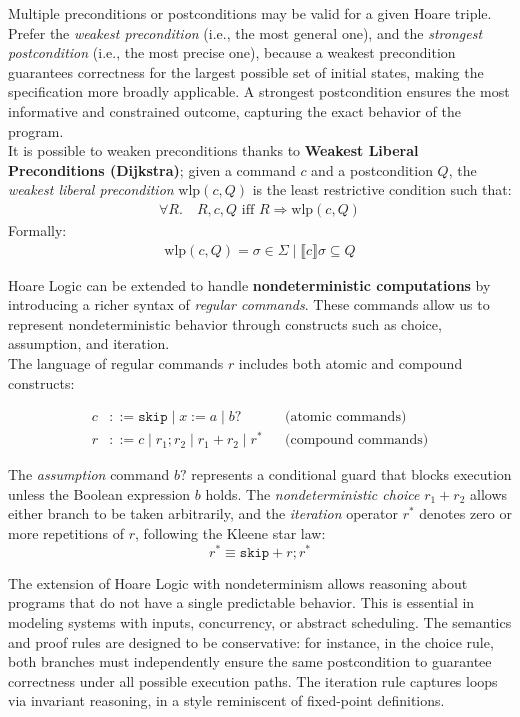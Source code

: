 \documentclass[parskip=half]{scrartcl}
\begin{document}
Multiple preconditions or postconditions may be valid for a given Hoare triple. Prefer the \emph{weakest precondition} (i.e., the most general one), and the \emph{strongest postcondition} (i.e., the most precise one), because a weakest precondition guarantees correctness for the largest possible set of initial states, making the specification more broadly applicable. A strongest postcondition ensures the most informative and constrained outcome, capturing the exact behavior of the program.
\\It is possible to weaken preconditions thanks to \textbf{Weakest Liberal Preconditions (Dijkstra)}; given a command $c$ and a postcondition $Q$, the \emph{weakest liberal precondition} $\text{wlp}(c, Q)$ is the least restrictive condition such that:
\begin{align*}
\forall R. \quad {R}, c, {Q} \text{ iff } R \Rightarrow \text{wlp}(c, Q)
\end{align*}
Formally:
\begin{align*}
\text{wlp}(c, Q) = {\sigma \in \Sigma \mid \llbracket c \rrbracket {\sigma} \subseteq Q}
\end{align*}

Hoare Logic can be extended to handle \textbf{nondeterministic computations} by introducing a richer syntax of \emph{regular commands}. These commands allow us to represent nondeterministic behavior through constructs such as choice, assumption, and iteration.
\\ The language of regular commands $r$ includes both atomic and compound constructs:

\begin{align*}
  c &::= \texttt{skip} \mid x := a \mid b? && \text{(atomic commands)} \\
  r &::= c \mid r_1 ; r_2 \mid r_1 + r_2 \mid r^* && \text{(compound commands)}
\end{align*}

\noindent
The \emph{assumption} command $b?$ represents a conditional guard that blocks execution unless the Boolean expression $b$ holds. The \emph{nondeterministic choice} $r_1 + r_2$ allows either branch to be taken arbitrarily, and the \emph{iteration} operator $r^*$ denotes zero or more repetitions of $r$, following the Kleene star law:
\[
r^* \equiv \texttt{skip} + r ; r^*
\]

The extension of Hoare Logic with nondeterminism allows reasoning about programs that do not have a single predictable behavior. This is essential in modeling systems with inputs, concurrency, or abstract scheduling. The semantics and proof rules are designed to be conservative: for instance, in the choice rule, both branches must independently ensure the same postcondition to guarantee correctness under all possible execution paths. The iteration rule captures loops via invariant reasoning, in a style reminiscent of fixed-point definitions.
\end{document}
